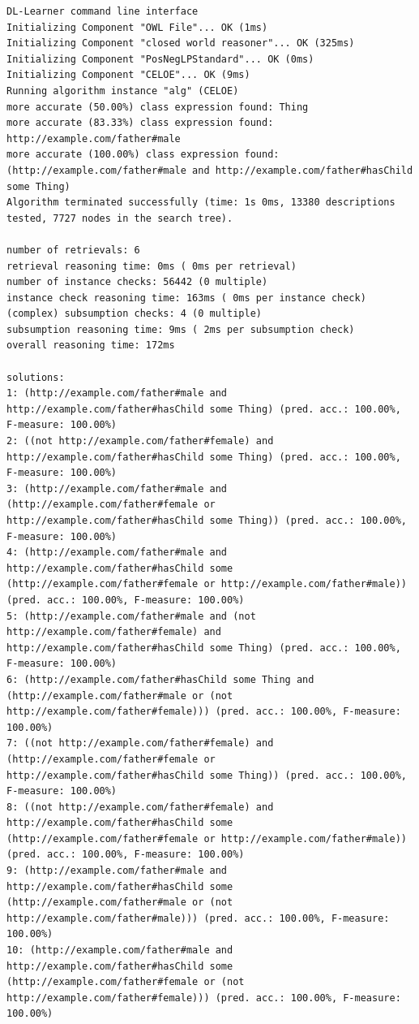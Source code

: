 \documentclass[a4paper,12pt]{scrartcl}
\begin{document}
\begin{lstlisting}
DL-Learner command line interface
Initializing Component "OWL File"... OK (1ms)
Initializing Component "closed world reasoner"... OK (325ms)
Initializing Component "PosNegLPStandard"... OK (0ms)
Initializing Component "CELOE"... OK (9ms)
Running algorithm instance "alg" (CELOE)
more accurate (50.00%) class expression found: Thing
more accurate (83.33%) class expression found: http://example.com/father#male
more accurate (100.00%) class expression found: (http://example.com/father#male and http://example.com/father#hasChild some Thing)
Algorithm terminated successfully (time: 1s 0ms, 13380 descriptions tested, 7727 nodes in the search tree).

number of retrievals: 6
retrieval reasoning time: 0ms ( 0ms per retrieval)
number of instance checks: 56442 (0 multiple)
instance check reasoning time: 163ms ( 0ms per instance check)
(complex) subsumption checks: 4 (0 multiple)
subsumption reasoning time: 9ms ( 2ms per subsumption check)
overall reasoning time: 172ms

solutions:
1: (http://example.com/father#male and http://example.com/father#hasChild some Thing) (pred. acc.: 100.00%, F-measure: 100.00%)
2: ((not http://example.com/father#female) and http://example.com/father#hasChild some Thing) (pred. acc.: 100.00%, F-measure: 100.00%)
3: (http://example.com/father#male and (http://example.com/father#female or http://example.com/father#hasChild some Thing)) (pred. acc.: 100.00%, F-measure: 100.00%)
4: (http://example.com/father#male and http://example.com/father#hasChild some (http://example.com/father#female or http://example.com/father#male)) (pred. acc.: 100.00%, F-measure: 100.00%)
5: (http://example.com/father#male and (not http://example.com/father#female) and http://example.com/father#hasChild some Thing) (pred. acc.: 100.00%, F-measure: 100.00%)
6: (http://example.com/father#hasChild some Thing and (http://example.com/father#male or (not http://example.com/father#female))) (pred. acc.: 100.00%, F-measure: 100.00%)
7: ((not http://example.com/father#female) and (http://example.com/father#female or http://example.com/father#hasChild some Thing)) (pred. acc.: 100.00%, F-measure: 100.00%)
8: ((not http://example.com/father#female) and http://example.com/father#hasChild some (http://example.com/father#female or http://example.com/father#male)) (pred. acc.: 100.00%, F-measure: 100.00%)
9: (http://example.com/father#male and http://example.com/father#hasChild some (http://example.com/father#male or (not http://example.com/father#male))) (pred. acc.: 100.00%, F-measure: 100.00%)
10: (http://example.com/father#male and http://example.com/father#hasChild some (http://example.com/father#female or (not http://example.com/father#female))) (pred. acc.: 100.00%, F-measure: 100.00%)
\end{lstlisting}
\end{document}
